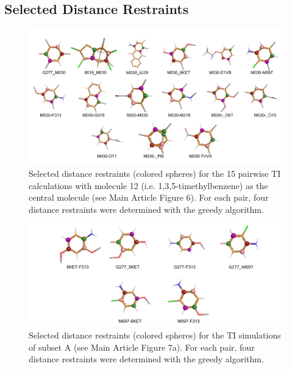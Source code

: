 \subsection{Selected Distance Restraints}
\begin{figure}[H]
    \centering
    \includegraphics[width=\textwidth]{fig/results/pairwise/restraintPlacement/Restraints_PairwiseTI_M030Graph.png}
    \caption{Selected distance restraints (colored spheres) for the 15 pairwise TI calculations with molecule 12 (i.e. 1,3,5-timethylbenzene) as the central molecule (see Main Article Figure 6). For each pair, four distance restraints were determined with the greedy algorithm.}
    \label{SIfig: Pairwise_TI_M030_Graph}
\end{figure}

\begin{figure}[H]
    \centering
    \includegraphics[width=\textwidth]{fig/results/pairwise/restraintPlacement/Restraints_PairwiseTI_reedsaddition.png}
    \caption{Selected distance restraints (colored spheres) for the TI simulations of subset A (see Main Article Figure 7a). For each pair, four distance restraints were determined with the greedy algorithm.}
    \label{SIfig:Pairwise_TI_AddRE-EDS_Graph}
\end{figure}

\clearpage

